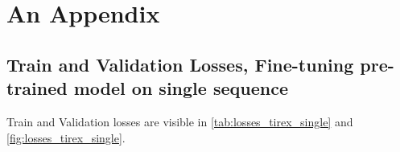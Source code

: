 \documentclass[a4paper,oneside,10pt,ngerman,english]{scrartcl}
\begin{document}
\printbibliography

\appendix


\section{An Appendix}
\label{app:an-appendix}

\subsection{Train and Validation Losses, Fine-tuning pre-trained model on single sequence}
\label{sec:losses_tirex_single}

Train and Validation losses are visible in \autoref{tab:losses_tirex_single} and \autoref{fig:losses_tirex_single}.
\end{document}
